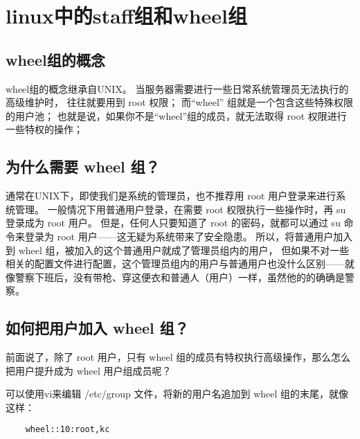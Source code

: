 \documentclass[a4paper,left=1.5cm,right=1.5cm,11pt]{article}
\begin{document}
\tableofcontents

\clearpage

\section{linux中的staff组和wheel组}

\subsection{wheel组的概念}
	wheel组的概念继承自UNIX。
	当服务器需要进行一些日常系统管理员无法执行的高级维护时，
	往往就要用到 root 权限；
	而“wheel” 组就是一个包含这些特殊权限的用户池；
	也就是说，如果你不是“wheel”组的成员，就无法取得 root 权限进行一些特权的操作；
 
\subsection{为什么需要 wheel 组？}
	通常在UNIX下，即使我们是系统的管理员，也不推荐用 root 用户登录来进行系统管理。
	一般情况下用普通用户登录，在需要 root 权限执行一些操作时，再 su 登录成为 root 用户。
	但是，任何人只要知道了 root 的密码，就都可以通过 su 命令来登录为 root 用户——这无疑为系统带来了安全隐患。
	所以，将普通用户加入到 wheel 组，被加入的这个普通用户就成了管理员组内的用户，
	但如果不对一些相关的配置文件进行配置，这个管理员组内的用户与普通用户也没什么区别——就像警察下班后，没有带枪、穿这便衣和普通人（用户）一样，虽然他的的确确是警察。

\subsection{如何把用户加入 wheel 组？}
 
	前面说了，除了 root 用户，只有 wheel 组的成员有特权执行高级操作，那么怎么把用户提升成为 wheel 用户组成员呢？
 
	可以使用vi来编辑 /etc/group 文件，将新的用户名追加到 wheel 组的末尾，就像这样：

	\begin{lstlisting}
	wheel::10:root,kc
	\end{lstlisting}
\end{document}
